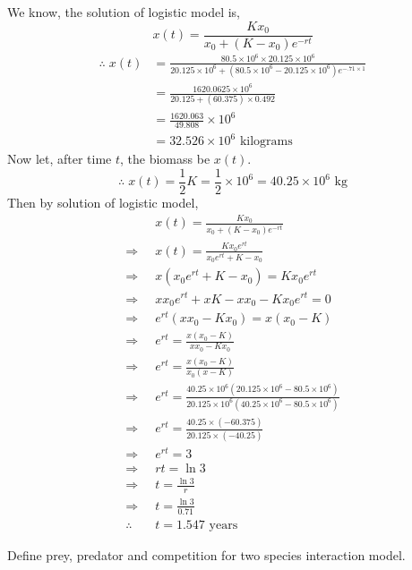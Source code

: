 \documentclass[../main-sheet.tex]{subfiles}
\begin{document}
\begin{soln}
    We know, the solution of logistic model is,
    \[
        x(t)=\frac{K x_0}{x_0+(K-x_0)e^{-rt}}
        \]
        \begin{align*}
            \therefore \;x(t)&=\frac{80.5\times 10^6 \times 20.125\times 10^6}{20.125\times 10^6+(80.5\times 10^6-20.125\times 10^6)e^{-.71\times 1}}\\
            &=\frac{1620.0625\times 10^6}{20.125+(60.375)\times 0.492}\\
            &=\frac{1620.063}{49.808}\times 10^6\\
            &=32.526\times 10^6\text{ kilograms}
        \end{align*}
    Now let, after time \(t\), the biomass be \(x(t)\).
    \[
        \therefore\;x(t)=\frac{1}{2}K=\frac{1}{2}\times 10^6=40.25\times10^6\text{ kg}
    \]
    Then by solution of logistic model,
    \begin{align*}
        &x(t)=\frac{K x_0}{x_0+(K-x_0)e^{-rt}}\\
        \Rightarrow\;\;&x(t)=\frac{K x_0e^{rt}}{x_0e^{rt}+K-x_0}\\
        \Rightarrow\;\;&x\left( {x_0e^{rt}+K-x_0} \right)={K x_0e^{rt}}\\
        \Rightarrow\;\;&xx_0e^{rt}+xK-xx_0-{K x_0e^{rt}}=0\\
        \Rightarrow\;\;&e^{rt}\left(xx_0-{K x_0}\right)=x(x_0-K)\\
        \Rightarrow\;\;&e^{rt}=\frac{x(x_0-K)}{xx_0-{K x_0}}\\
        \Rightarrow\;\;&e^{rt}=\frac{x(x_0-K)}{x_0(x-K)}\\
        \Rightarrow\;\;&e^{rt}=\frac{40.25\times10^6(20.125\times10^6-80.5\times10^6)}{20.125\times10^6(40.25\times10^6-80.5\times10^6)}\\
        \Rightarrow\;\;&e^{rt}=\frac{40.25\times (-60.375)}{20.125\times (-40.25)}\\
        \Rightarrow\;\;&e^{rt}=3\\
        \Rightarrow\;\;&{rt}=\ln 3\\
        \Rightarrow\;\;&{t}=\frac{\ln 3}{r}\\
        \Rightarrow\;\;&{t}=\frac{\ln 3}{0.71}\\
        \therefore\;\;&{t}=1.547 \text{ years}
    \end{align*}
\end{soln}
\begin{prob}
    Define prey, predator and competition for two species interaction model.
\end{prob}
\end{document}
